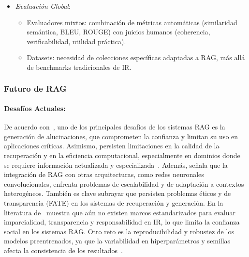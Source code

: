 \begin{itemize}
\begin{itemize}
        \item \textit{Evaluación Global}: 
        \begin{itemize}
            \item Evaluadores mixtos: combinación de métricas automáticas (similaridad semántica, BLEU, ROUGE) con juicios humanos (coherencia, verificabilidad, utilidad práctica).
            \item Datasets: necesidad de colecciones específicas adaptadas a RAG, más allá de benchmarks tradicionales de IR.
        \end{itemize}
    \end{itemize}
    
\end{itemize}


\subsubsection{Futuro de RAG}

\paragraph{Desafíos Actuales:}
De acuerdo con~\textcite{zhai2024llmIR}, uno de los principales desafíos de los sistemas RAG es la generación de alucinaciones, que comprometen la confianza y 
limitan su uso en aplicaciones críticas. Asimismo, persisten limitaciones en la calidad de la recuperación y en la eficiencia computacional, especialmente 
en dominios donde se requiere información actualizada y especializada~\parencite{hu2024ragrau}. Además, \textcite{ramdurai2025llm} señala que la integración de RAG con otras
arquitecturas, como redes neuronales convolucionales, enfrenta problemas de escalabilidad y de adaptación a contextos heterogéneos. También es clave subrayar que persisten problemas éticos y de transparencia (FATE) en los sistemas de recuperación y generación.
En la literatura de~\textcite{bernard2025fate} muestra que aún no existen marcos estandarizados para evaluar imparcialidad, transparencia y responsabilidad en IR, lo que limita la confianza social en los sistemas RAG. 
Otro reto es la reproducibilidad y robustez de los modelos preentrenados, ya que la variabilidad en hiperparámetros y semillas afecta la consistencia de los resultados~\parencite{fan2021pretraining}.

